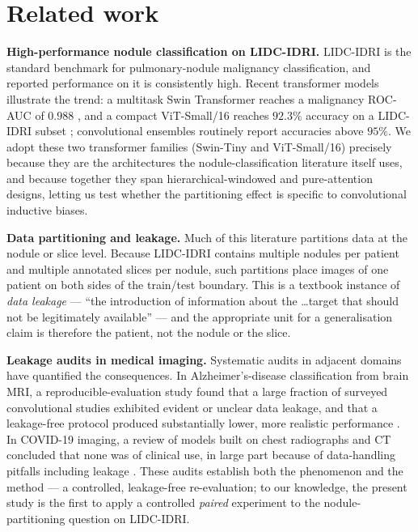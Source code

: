 \documentclass{article}
\newcommand{\vcite}[1]{\cite{#1}}
\begin{document}
\section{Related work}
\textbf{High-performance nodule classification on LIDC-IDRI.} LIDC-IDRI \vcite{armato2011} is the
standard benchmark for pulmonary-nodule malignancy classification, and reported performance on it is
consistently high. Recent transformer models illustrate the trend: a multitask Swin Transformer
reaches a malignancy ROC-AUC of $0.988$ \vcite{jin2025}, and a compact ViT-Small/16 reaches $92.3\%$
accuracy on a LIDC-IDRI subset \vcite{thakur2026}; convolutional ensembles routinely report
accuracies above $95\%$. We adopt these two transformer families (Swin-Tiny and ViT-Small/16)
precisely because they are the architectures the nodule-classification literature itself uses, and
because together they span hierarchical-windowed and pure-attention designs, letting us test whether
the partitioning effect is specific to convolutional inductive biases.

\textbf{Data partitioning and leakage.} Much of this literature partitions data at the nodule or
slice level. Because LIDC-IDRI contains multiple nodules per patient and multiple annotated slices
per nodule, such partitions place images of one patient on both sides of the train/test boundary.
This is a textbook instance of \emph{data leakage} --- ``the introduction of information about the
\ldots target that should not be legitimately available'' \vcite{kaufman2012} --- and the
appropriate unit for a generalisation claim is therefore the patient, not the nodule or the slice.

\textbf{Leakage audits in medical imaging.} Systematic audits in adjacent domains have quantified the
consequences. In Alzheimer's-disease classification from brain MRI, a reproducible-evaluation study
found that a large fraction of surveyed convolutional studies exhibited evident or unclear data
leakage, and that a leakage-free protocol produced substantially lower, more realistic performance
\vcite{wen2020}. In COVID-19 imaging, a review of models built on chest radiographs and CT concluded
that none was of clinical use, in large part because of data-handling pitfalls including leakage
\vcite{roberts2021}. These audits establish both the phenomenon and the method --- a controlled,
leakage-free re-evaluation; to our knowledge, the present study is the first to apply a controlled
\emph{paired} experiment to the nodule-partitioning question on LIDC-IDRI.
\end{document}
